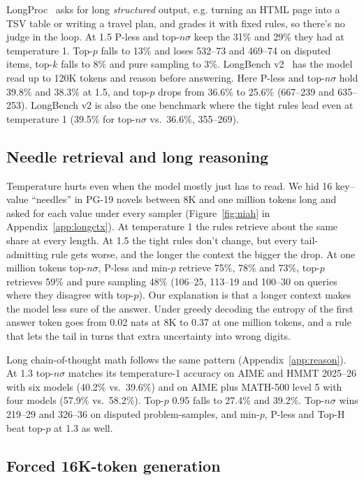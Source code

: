 \documentclass{article}
\begin{document}
LongProc~\citep{ye2025longproc} asks for long \emph{structured} output, e.g. turning an HTML page into a TSV table or writing a travel plan, and grades it with fixed rules, so there's no judge in the loop. At 1.5 P-less and top-$n\sigma$ keep the 31\% and 29\% they had at temperature 1. Top-$p$ falls to 13\% and loses 532--73 and 469--74 on disputed items, top-$k$ falls to 8\% and pure sampling to 3\%. LongBench v2~\citep{bai2025longbenchv2} has the model read up to 120K tokens and reason before answering. Here P-less and top-$n\sigma$ hold 39.8\% and 38.3\% at 1.5, and top-$p$ drops from 36.6\% to 25.6\% (667--239 and 635--253). LongBench v2 is also the one benchmark where the tight rules lead even at temperature 1 (39.5\% for top-$n\sigma$ vs.\ 36.6\%, 355--269).

\subsection{Needle retrieval and long reasoning}
\label{sec:read}

Temperature hurts even when the model mostly just has to read. We hid 16 key--value ``needles'' in PG-19 novels between 8K and one million tokens long and asked for each value under every sampler (Figure~\ref{fig:niah} in Appendix~\ref{app:longctx}). At temperature 1 the rules retrieve about the same share at every length. At 1.5 the tight rules don't change, but every tail-admitting rule gets worse, and the longer the context the bigger the drop. At one million tokens top-$n\sigma$, P-less and min-$p$ retrieve 75\%, 78\% and 73\%, top-$p$ retrieves 59\% and pure sampling 48\% (106--25, 113--19 and 100--30 on queries where they disagree with top-$p$). Our explanation is that a longer context makes the model less sure of the answer. Under greedy decoding the entropy of the first answer token goes from 0.02 nats at 8K to 0.37 at one million tokens, and a rule that lets the tail in turns that extra uncertainty into wrong digits.

Long chain-of-thought math follows the same pattern (Appendix~\ref{app:reason}). At 1.3 top-$n\sigma$ matches its temperature-1 accuracy on AIME and HMMT 2025--26 with six models (40.2\% vs.\ 39.6\%) and on AIME plus MATH-500 level 5 with four models (57.9\% vs.\ 58.2\%). Top-$p$ 0.95 falls to 27.4\% and 39.2\%. Top-$n\sigma$ wins 219--29 and 326--36 on disputed problem-samples, and min-$p$, P-less and Top-H beat top-$p$ at 1.3 as well.

\subsection{Forced 16K-token generation}
\label{sec:r1}
\end{document}
